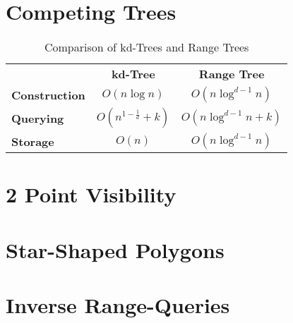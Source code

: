 \section {Competing Trees}
\begin{table}
\caption{Comparison of kd-Trees and Range Trees}
\centering
\begin{tabular}{l c c}
\hline
& \textbf{kd-Tree} & \textbf{Range Tree} \\
\textbf{Construction} & $O(n\log n)$ &  $O(n\log^{d-1}n)$ \\
\textbf{Querying} & $O(n^{1-\frac{1}{d}} + k)$ & $O(n\log^{d-1}n+k)$ \\
\textbf{Storage} & $O(n)$ & $O(n\log^{d-1}n)$ \\
\hline
\end{tabular}
\end{table}

\section {2 Point Visibility}

\section {Star-Shaped Polygons}

\section {Inverse Range-Queries}


